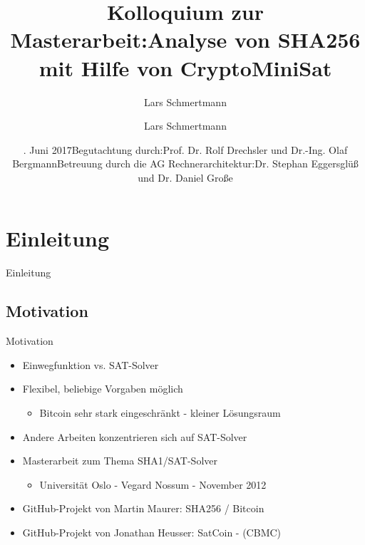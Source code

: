 \documentclass{beamer}
\title[Analyse von SHA256 mit Hilfe von CryptoMiniSat]{Kolloquium zur Masterarbeit:\newline Analyse von SHA256 mit Hilfe von CryptoMiniSat}
\author{Lars Schmertmann}
\date{\vspace*{-1cm}\newline 14. Juni 2017\newline\newline Begutachtung durch:\newline Prof. Dr. Rolf Drechsler und Dr.-Ing. Olaf Bergmann\newline \newline Betreuung durch die AG Rechnerarchitektur:\newline Dr. Stephan Eggersglüß und Dr. Daniel Große}
\begin{document}
\maketitle

\author{Lars Schmertmann}


\section{Einleitung}
  \begin{frame}{}
    \begin{center}
      \Huge Einleitung
    \end{center}
  \end{frame}
  \subsection{Motivation}
    \begin{frame}{Motivation}
      \begin{itemize}
        \setlength{\itemsep}{12pt}
        \item Einwegfunktion vs. SAT-Solver
        \item Flexibel, beliebige Vorgaben möglich
        \begin{itemize}
          \item Bitcoin sehr stark eingeschränkt - kleiner Lösungsraum
        \end{itemize}
        \item Andere Arbeiten konzentrieren sich auf SAT-Solver
        \item Masterarbeit zum Thema SHA1/SAT-Solver
        \begin{itemize}
          \item Universität Oslo - Vegard Nossum - November 2012
        \end{itemize}
        \item GitHub-Projekt von Martin Maurer: SHA256 / Bitcoin
        \item GitHub-Projekt von Jonathan Heusser: SatCoin - (CBMC)
      \end{itemize}
    \end{frame}
\end{document}
